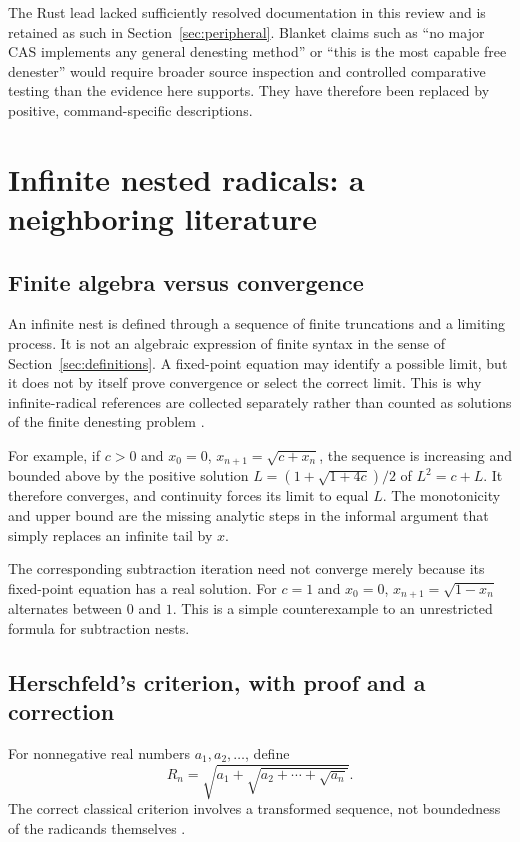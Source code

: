 \documentclass[11pt,oneside]{article}
\numberwithin{equation}{section}
\theoremstyle{definition}
\theoremstyle{remark}
\begin{document}
The Rust lead lacked sufficiently resolved documentation in this review and is retained as such in Section~\ref{sec:peripheral}. Blanket claims such as ``no major CAS implements any general denesting method'' or ``this is the most capable free denester'' would require broader source inspection and controlled comparative testing than the evidence here supports. They have therefore been replaced by positive, command-specific descriptions.

\section{Infinite nested radicals: a neighboring literature}\label{sec:infinite}

\subsection{Finite algebra versus convergence}
An infinite nest is defined through a sequence of finite truncations and a limiting process. It is not an algebraic expression of finite syntax in the sense of Section~\ref{sec:definitions}. A fixed-point equation may identify a possible limit, but it does not by itself prove convergence or select the correct limit. This is why infinite-radical references are collected separately rather than counted as solutions of the finite denesting problem \cite{herschfeld,borweinradicals}.

For example, if $c>0$ and $x_0=0$, $x_{n+1}=\sqrt{c+x_n}$, the sequence is increasing and bounded above by the positive solution $L=(1+\sqrt{1+4c})/2$ of $L^2=c+L$. It therefore converges, and continuity forces its limit to equal $L$. The monotonicity and upper bound are the missing analytic steps in the informal argument that simply replaces an infinite tail by $x$.

The corresponding subtraction iteration need not converge merely because its fixed-point equation has a real solution. For $c=1$ and $x_0=0$, $x_{n+1}=\sqrt{1-x_n}$ alternates between $0$ and $1$. This is a simple counterexample to an unrestricted formula for subtraction nests.

\subsection{Herschfeld's criterion, with proof and a correction}
For nonnegative real numbers $a_1,a_2,\ldots$, define
\[
R_n=\sqrt{a_1+\sqrt{a_2+\cdots+\sqrt{a_n}}}.
\]
The correct classical criterion involves a transformed sequence, not boundedness of the radicands themselves \cite{herschfeld}.
\end{document}

